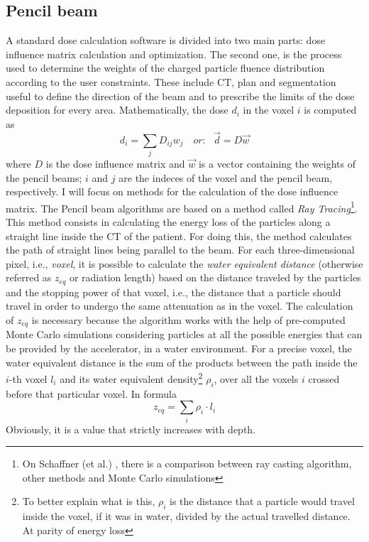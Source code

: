 \documentclass[12pt, a4paper, twoside]{book}
\begin{document}
\subsection{Pencil beam} 
\label{sec:pen}
A standard dose calculation software is divided into two main parts: dose influence matrix calculation and optimization. The second one, is the process used to determine the weights of the charged particle fluence distribution according to the user constraints. These include CT, plan and segmentation useful to define the direction of the beam and to prescribe the limits of the dose deposition for every area.
Mathematically, the dose $d_i$ in the voxel $i$ is computed as
\[
d_i = \sum_j D_{ij}w_j\,\,\,\,\,\,\textit{or:}\,\,\,\,\,\vec{d} = D\vec{w}
\]
where $D$ is the dose influence matrix and $\vec{w}$ is a vector containing the weights of the pencil beams; $i$ and $j$ are the indeces of the voxel and the pencil beam, respectively.
I will focus on methods for the calculation of the dose influence matrix.
The Pencil beam algorithms are based on a method called \emph{Ray Tracing}\footnote{On Schaffner (et al.) \cite{schaf:pba}, there is a comparison between ray casting algorithm, other methods and Monte Carlo simulations}. This method consists in calculating the energy loss of the particles along a straight line inside the CT of the patient. For doing this, the method calculates the path of straight lines being parallel to the beam. For each three-dimensional pixel, i.e., \emph{voxel}, it is possible to calculate the \emph{water equivalent distance} (otherwise referred as $z_{eq}$ or radiation length) based on the distance traveled by the particles and the stopping power of that voxel, i.e., the distance that a particle should travel in order to undergo the same attenuation as in the voxel. The calculation of $z_{eq}$ is necessary because the algorithm works with the help of pre-computed Monte Carlo simulations considering particles at all the possible energies that can be provided by the accelerator, in a water environment. 
For a precise voxel, the water equivalent distance is the sum of the products between the path inside the $i$-th voxel $l_i$ and its water equivalent density\footnote{To better explain what is this, $\rho_i$ is the distance that a particle would travel inside the voxel, if it was in water, divided by the actual travelled distance. At parity of energy loss} $\rho_i$, over all the voxels $i$ crossed before that particular voxel.
In formula
\[
z_{eq} = \sum_{i} \rho_i\cdot l_i
\]
Obviously, it is a value that strictly increases with depth.
\end{document}
